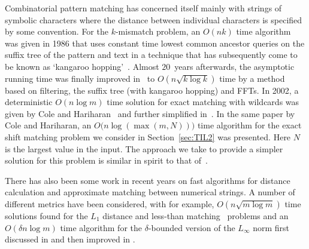 \documentclass[11pt]{article}
\theoremstyle{plain}
\theoremstyle{definition}
\begin{document}
Combinatorial pattern matching has concerned itself mainly with
strings of symbolic characters where the distance between individual
characters is specified by some convention. For the $k$-mismatch problem, an $O(nk)$ time algorithm was given in 1986 that uses constant time lowest common ancestor queries on the suffix tree of the pattern and text in a technique that has subsequently come to be known as `kangaroo hopping'~\cite{LV:1986a}. Almost $20$~years afterwards, the asymptotic running time was finally improved in~\cite{ALP:2004} to $O(n\sqrt{k\log{k}})$ time by a method based on filtering, the suffix tree (with kangaroo hopping) and FFTs.  In 2002, a deterministic $O(n\log{m})$ time solution for exact matching with wildcards was given by Cole and Hariharan~\cite{CH:2002} and further simplified in~\cite{Clifford:2007}.  In the same paper by Cole and Hariharan, an $O\big(n\log(\max(m,N))\big)$ time algorithm for the exact shift matching problem we consider in Section~\ref{sec:TIL2} was presented. Here $N$ is the largest value in the input.  The approach we take to provide a simpler solution for this problem is similar in spirit to that of~\cite{Clifford:2007}.

There has also been some work in recent years on fast algorithms for distance calculation and approximate matching between numerical strings.  A number of different metrics
have been considered, with for example, $O(n\sqrt{m\log{m}})$ time solutions found for the $L_1$ distance \cite{Atallah:01,CCI:2005,ALPU:2005}
and less-than matching~\cite{Amir:1995} problems and an $O(\delta n \log{m})$ time algorithm for the $\delta$-bounded version of the
$L_{\infty}$ norm first discussed in \cite{CI:2004a} and then improved in \cite{CCI:2005, LP:2005}.
\end{document}
